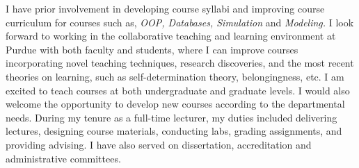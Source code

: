 \documentclass[10pt]{article}
\renewcommand*\paragraph[1]{}
\begin{document}
\paragraph{curriculum development for lecture and lab courses in Computer Science/Data Science}
I have prior involvement in developing course syllabi and improving course curriculum for courses such as, \textit{OOP, Databases, Simulation} and \textit{Modeling.}
I look forward to working in the collaborative teaching and learning environment at Purdue with both faculty and students, where I can improve courses incorporating novel teaching  techniques, research discoveries, and the most recent theories on learning, such as self-determination theory, belongingness, etc. 
I am excited to teach courses at both undergraduate and graduate levels. 
I would also welcome the opportunity to develop new courses according to the departmental needs.
During my tenure as a full-time lecturer, my duties included delivering lectures, designing course materials, conducting labs, grading assignments, and providing advising. 
I have also served on dissertation, accreditation and administrative committees.

\paragraph{interdiscipliniary colab}

\paragraph{P4) The ability to contribute through teaching and/or service to the diversity, cultural sensitivity, and excellence of the academic community.}
\end{document}
